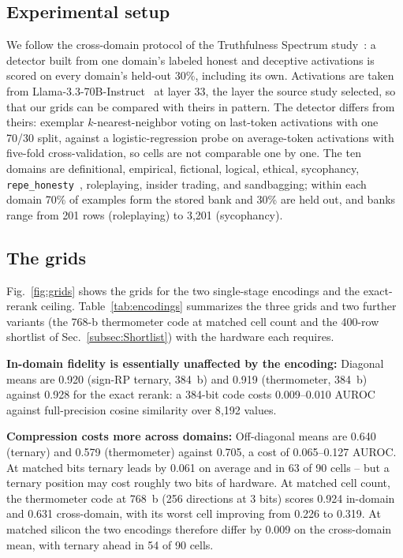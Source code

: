 \documentclass[conference]{IEEEtran}
\newcommand{\auroc}{{AUROC}\xspace}
\newcommand{\signrp}{{sign-RP}\xspace}
\begin{document}
\subsection{Experimental setup}
\label{subsec:Setup}
We follow the cross-domain protocol of the Truthfulness Spectrum
study~\cite{ying2026spectrum}: a detector built from one domain's
labeled honest and deceptive activations is scored on every
domain's held-out 30\%, including its own. Activations are taken
from Llama-3.3-70B-Instruct~\cite{llama3herd} at layer 33, the layer
the source study selected, so that our grids can be compared with
theirs in pattern. The detector differs from theirs: exemplar
$k$-nearest-neighbor voting on last-token activations with one 70/30
split, against a logistic-regression probe on average-token
activations with five-fold cross-validation, so cells are not
comparable one by one. The ten domains are definitional,
empirical, fictional, logical, ethical, sycophancy,
\texttt{repe\_honesty}~\cite{zou2023repe}, roleplaying, insider
trading, and sandbagging; within each domain 70\% of examples form
the stored bank and 30\% are held out, and banks range from 201 rows
(roleplaying) to 3{,}201 (sycophancy).

\subsection{The grids}
\label{subsec:Grids}
Fig.~\ref{fig:grids} shows the grids for the two single-stage
encodings and the exact-rerank ceiling. Table~\ref{tab:encodings}
summarizes the three grids and two further variants (the 768-b
thermometer code at matched cell count and the 400-row shortlist of
Sec.~\ref{subsec:Shortlist}) with the hardware each requires.

\textbf{In-domain fidelity is essentially unaffected by the
encoding:} Diagonal means are 0.920 (\signrp ternary, 384~b) and
0.919 (thermometer, 384~b) against 0.928 for the exact rerank: a
384-bit code costs 0.009--0.010 \auroc against full-precision cosine
similarity over 8{,}192 values.

\textbf{Compression costs more across domains:}
Off-diagonal means are 0.640 (ternary) and 0.579 (thermometer)
against 0.705, a cost of 0.065--0.127 \auroc. At matched bits ternary
leads by 0.061 on average and in 63 of 90 cells -- but a ternary
position may cost roughly two bits of hardware. At matched cell
count, the thermometer code at 768~b (256 directions at 3 bits)
scores 0.924 in-domain and 0.631 cross-domain, with its worst cell
improving from 0.226 to 0.319. At matched silicon the two encodings
therefore differ by 0.009 on the cross-domain mean, with ternary
ahead in 54 of 90 cells.
\end{document}
